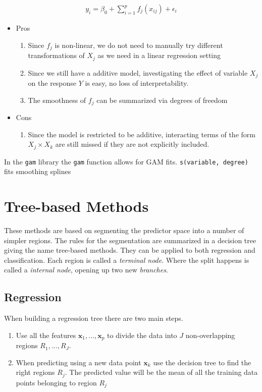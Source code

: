 \documentclass{article}
\renewcommand{\vec}[1]{\mathbf{#1}} %
\begin{document}
\begin{align*}
    y_i = \beta_0 + \sum_{i=1}^{p} f_j (x_{ij}) + \epsilon_i
\end{align*}

\begin{itemize}
    \item Pros
    \begin{enumerate}
        \item Since $f_j$ is non-linear, we do not need to manually try different transformations of $X_j$ as we need in a linear regression setting
        \item Since we still have a additive model, investigating the effect of variable $X_j$ on the response $Y$ is easy, no loss of interpretability.
        \item The smoothness of $f_j$ can be summarized via degrees of freedom
    \end{enumerate}
    \item Cons
    \begin{enumerate}
        \item Since the model is restricted to be additive, interacting terms of the form $X_j \times X_k$ are still missed if they are not explicitly included. 
    \end{enumerate}
\end{itemize}

In the \texttt{gam} library the \texttt{gam} function allows for GAM fits. \texttt{s(variable, degree)} fits smoothing splines

\section{Tree-based Methods}
These methods are based on segmenting the predictor space into a number of simpler regions. The rules for the segmentation are summarized in a decision tree giving the name tree-based methods. They can be applied to both regression and classification.
Each region is called a \textit{terminal node}. Where the split happens is called  a \textit{internal node}, opening up two new \textit{branches}.

\subsection{Regression}
When building a regression tree there are two main steps.

\begin{enumerate}
    \item Use all the features $\vec{x}_1, ... , \vec{x}_p$ to divide the data into $J$ non-overlapping regions $R_1 , ... , R_J$.
    \item When predicting using a new data point $\vec{x}_k$ use the decision tree to find the right regions $R_j$. The predicted value will be the mean of all the training data points belonging to region $R_j$
\end{enumerate}
\end{document}
